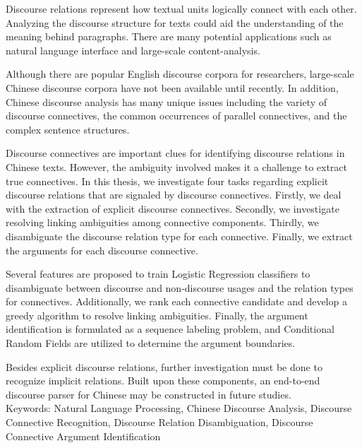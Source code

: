 \begin{abstracten}

Discourse relations represent how textual units logically connect
with each other. Analyzing the discourse structure for texts
could aid the understanding of the meaning behind paragraphs.
There are many potential applications such as natural language
interface and large-scale content-analysis.

Although there are popular English discourse corpora for researchers,
large-scale Chinese discourse corpora have not been available until
recently. In addition, Chinese discourse analysis has many
unique issues including the variety of discourse connectives,
the common occurrences of parallel connectives, and the complex
sentence structures.

Discourse connectives are important clues for identifying discourse
relations in Chinese texts. However, the ambiguity involved makes
it a challenge to extract true connectives. In this thesis, we investigate
four tasks regarding explicit discourse relations that are signaled
by discourse connectives. Firstly, we deal with the extraction
of explicit discourse connectives. Secondly, we investigate resolving
linking ambiguities among connective components.
Thirdly, we disambiguate the discourse relation type for each connective.
Finally, we extract the arguments for each discourse connective.

Several features are proposed to train Logistic Regression classifiers
to disambiguate between discourse and non-discourse usages and
the relation types for connectives. Additionally, we rank each
connective candidate and develop a greedy algorithm to resolve
linking ambiguities. Finally, the argument identification is formulated
as a sequence labeling problem, and Conditional Random Fields are
utilized to determine the argument boundaries.

Besides explicit discourse relations, further investigation must be done
to recognize implicit relations. Built upon these components,
an end-to-end discourse parser for Chinese may be constructed
in future studies. \\

\noindent
Keywords: Natural Language Processing, Chinese Discourse Analysis,
Discourse Connective Recognition, Discourse Relation Disambiguation,
Discourse Connective Argument Identification
\end{abstracten}

